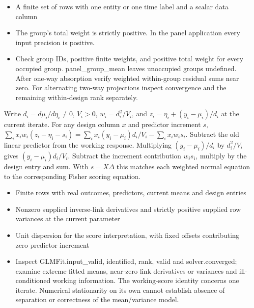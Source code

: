 \expandafter\def\csname statadic@assumptions@STATADIC-PANEL-001\endcsname{\begin{itemize}
\item A finite set of rows with one entity or one time label and a scalar data column
\item The group's total weight is strictly positive. In the panel application every input precision is positive.
\end{itemize}}
\expandafter\def\csname statadic@diagnostics@STATADIC-PANEL-001\endcsname{\begin{itemize}
\item Check group IDs, positive finite weights, and positive total weight for every occupied group. panel\_group\_mean leaves unoccupied groups undefined. After one-way absorption verify weighted within-group residual sums near zero. For alternating two-way projections inspect convergence and the remaining within-design rank separately.
\end{itemize}}
\expandafter\def\csname statadic@statement@STATADIC-GLM-001\endcsname{Write $d_i=d\mu_i/d\eta_i\ne0$, $V_i>0$,
  $w_i=d_i^2/V_i$, and $z_i=\eta_i+(y_i-\mu_i)/d_i$ at the current iterate.
  For any design column $x$ and predictor increment $s$,
  $\sum_i x_i w_i(z_i-\eta_i-s_i)=
  \sum_i x_i(y_i-\mu_i)d_i/V_i-\sum_i x_i w_i s_i$.}
\expandafter\def\csname statadic@proof@STATADIC-GLM-001\endcsname{Subtract the old linear predictor from the working response.
  Multiplying $(y_i-\mu_i)/d_i$ by $d_i^2/V_i$ gives
  $(y_i-\mu_i)d_i/V_i$. Subtract the increment contribution $w_i s_i$,
  multiply by the design entry and sum. With $s=X\Delta$ this matches
  each weighted normal equation to the corresponding Fisher scoring equation.}
\expandafter\def\csname statadic@assumptions@STATADIC-GLM-001\endcsname{\begin{itemize}
\item Finite rows with real outcomes, predictors, current means and design entries
\item Nonzero supplied inverse-link derivatives and strictly positive supplied row variances at the current parameter
\item Unit dispersion for the score interpretation, with fixed offsets contributing zero predictor increment
\end{itemize}}
\expandafter\def\csname statadic@diagnostics@STATADIC-GLM-001\endcsname{\begin{itemize}
\item Inspect GLMFit.input\_valid, identified, rank, valid and solver.converged; examine extreme fitted means, near-zero link derivatives or variances and ill-conditioned working information. The working-score identity concerns one iterate. Numerical stationarity on its own cannot establish absence of separation or correctness of the mean/variance model.
\end{itemize}}
